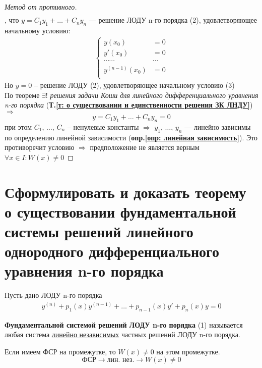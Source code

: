 \begin{proof}[Метод от противного]
\begin{align*}
    \end{align*}
    \newpage
    , что $y = C_1y_1 + \ldots + C_ny_n$ --- решение ЛОДУ n-го порядка (2), удовлетворяющее начальному условию:
    \begin{gather*}
        \left\{ \begin{aligned}
            y(x_0) &= 0 \\
            y'(x_0) &= 0 \\
            \cdots\cdots&\cdots \\
            y^{(n-1)}(x_0) &= 0 \\
        \end{aligned}\right.
    \end{gather*}
    Но $y=0$ -- решение ЛОДУ (2), удовлетворяющее начальному условию (3) \\
    По теореме $\exists!$ \textit{решения задачи Коши для линейного дифференциального уравнения n-го порядка} (\textbf{Т.\ref{т: о существовании и единственности решения ЗК ЛНДУ}}) $\Rightarrow$
    \[
        y = C_1y_1 + \ldots + C_ny_n = 0
    \]
    при этом $C_1,\, \ldots,\, C_n$ -- ненулевые константы $\Rightarrow$ $y_1,\, \ldots,\, y_n$ --- линейно зависимы по определению линейной зависимости (\textbf{опр.\ref{опр: линейная зависимость}}).
    Это противоречит условию $\Rightarrow$ предположение не является верным $\forall x \in I\colon W(x) \ne 0$
\end{proof}

\section{Сформулировать и доказать теорему о существовании фундаментальной системы решений линейного однородного дифференциального уравнения n-го порядка}

Пусть дано ЛОДУ n-го порядка
\begin{align*}
    y^{(n)} + p_1(x) y^{(n-1)} + \ldots + p_{n-1}(x)y' + p_n(x)y = 0 \tag{1}
\end{align*}
    
\begin{definition}
    \textbf{Фундаментальной системой решений ЛОДУ n-го порядка} (1) называется любая система \underline{линейно независимых} частных решений ЛОДУ n-го порядка.
\end{definition}

\setcounter{assertion}{1}
\begin{assertion}
    Если имеем ФСР на промежутке, то $W(x) \ne 0$ на этом промежутке.
    \[
    \text{ФСР} \rightarrow \text{лин. нез.} \rightarrow W(x) \ne 0
    \]
\end{assertion}

